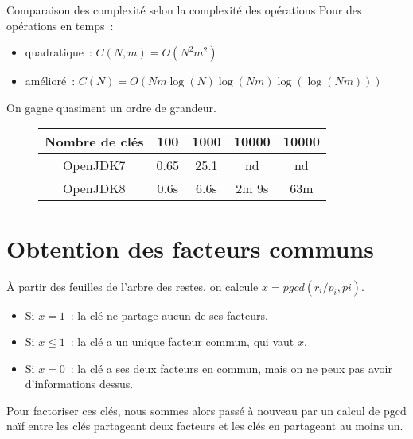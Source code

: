 \documentclass{beamer}
\begin{document}
\begin{frame}
 \begin{block}{Comparaison des complexité selon la complexité des opérations}
  Pour des opérations en temps~:
  \begin{itemize}
   \item quadratique~: $C(N,m) = O(N^2m^2)$
   \item amélioré~: $C(N) = O(Nm\log(N)\log(Nm)\log(\log(Nm)))$
  \end{itemize}
 \end{block}
 
 On gagne quasiment un ordre de grandeur.
 
 \begin{figure}[ht]
  \begin{center}
    \begin{tabular}{ccccc}
      \toprule
      Nombre de clés & 100 & 1000 & 10000 & 10000\\
      \toprule
      OpenJDK7 & 0.65 & 25.1 & nd & nd\\
      \midrule
      OpenJDK8 & 0.6s & 6.6s & 2m 9s & 63m\\
      \bottomrule
    \end{tabular}
  \end{center}
\end{figure}
\end{frame}


\section{Obtention des facteurs communs}
  
\begin{frame}
   À partir des feuilles de l'arbre des restes, on calcule $x = pgcd(r_i/p_i,pi)$.
   \begin{block}
   \begin{itemize}
    \item Si $x=1$~: la clé ne partage aucun de ses facteurs.
    \item Si $x \leq 1$~: la clé a un unique facteur commun, qui vaut $x$.
    \item Si $x=0$~: la clé a ses deux facteurs en commun, mais on ne peux pas avoir d'informations dessus.
   \end{itemize}
   \end{block}

   Pour factoriser ces clés, nous sommes alors passé à nouveau par un calcul de pgcd naïf entre les clés partageant deux facteurs et les clés en partageant au moins un.
\end{frame}
\end{document}
